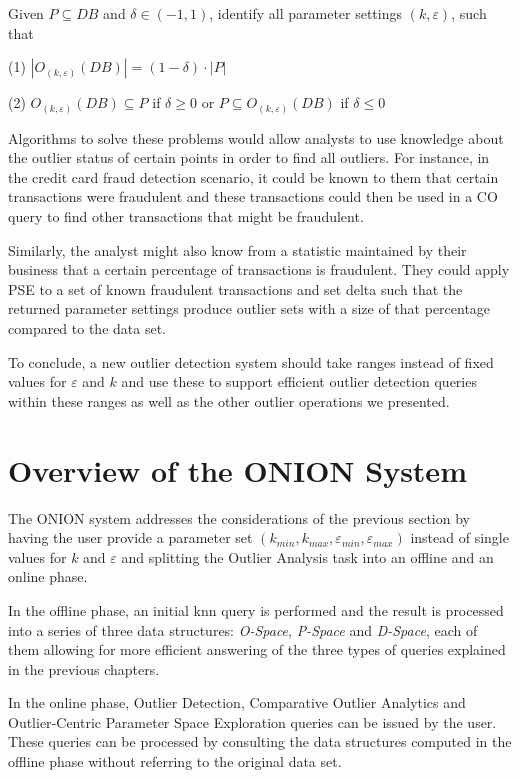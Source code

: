 \documentclass[runningheads]{llncs}
\begin{document}
\begin{definition}

\noindent Given $P\subseteq DB$ and $\delta \in (-1,1)$, identify all parameter settings $(k,\varepsilon)$, such that

\noindent(1) $|O_{(k,\varepsilon)}(DB)| = (1 - \delta) \cdot |P|$

\noindent(2) $O_{(k,\varepsilon)}(DB) \subseteq P$ if $\delta \geq 0$ or $P \subseteq O_{(k,\varepsilon)}(DB)$ if $\delta \leq 0$
\end{definition}

Algorithms to solve these problems would allow analysts to use knowledge about the outlier status of certain points in order to find all outliers. For instance, in the credit card fraud detection scenario, it could be known to them that certain transactions were fraudulent and these transactions could then be used in a CO query to find other transactions that might be fraudulent.

Similarly, the analyst might also know from a statistic maintained by their business that a certain percentage of transactions is fraudulent. They could apply PSE to a set of known fraudulent transactions and set delta such that the returned parameter settings produce outlier sets with a size of that percentage compared to the data set.

To conclude, a new outlier detection system should take ranges instead of fixed values for $\varepsilon$ and $k$ and use these to support efficient outlier detection queries within these ranges as well as the other outlier operations we presented.
\section{Overview of the ONION System}
The ONION system addresses the considerations of the previous section by having the user provide a parameter set $(k_{min},k_{max},\varepsilon_{min},\varepsilon_{max})$ instead of single values for $k$ and $\varepsilon$ and splitting the Outlier Analysis task into an offline and an online phase.

In the offline phase, an initial knn query is performed and the result is processed into a series of three data structures: \emph{O-Space}, \emph{P-Space} and \emph{D-Space}, each of them allowing for more efficient answering of the three types of queries explained in the previous chapters.

In the online phase, Outlier Detection, Comparative Outlier Analytics and Outlier-Centric Parameter Space Exploration queries can be issued by the user. These queries can be processed by consulting the data structures computed in the offline phase without referring to the original data set.
\end{document}
